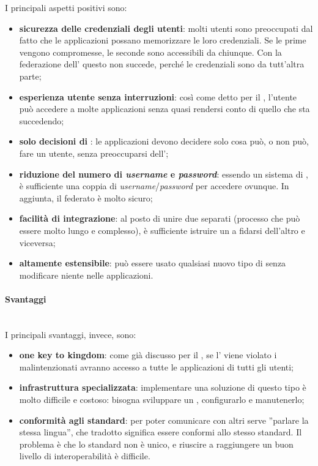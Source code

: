 I principali aspetti positivi sono:
\begin{itemize}
\item \textbf{sicurezza delle credenziali degli utenti}: molti utenti sono preoccupati dal fatto che le applicazioni possano memorizzare le loro credenziali. Se le prime vengono compromesse, le seconde sono accessibili da chiunque. Con la federazione dell' questo non succede, perché le credenziali sono da tutt'altra parte;
\item \textbf{esperienza utente senza interruzioni}: così come detto per il , l'utente può accedere a molte applicazioni senza quasi rendersi conto di quello che sta succedendo;
\item \textbf{solo decisioni di }: le applicazioni devono decidere solo cosa può, o non può, fare un utente, senza preoccuparsi dell';
\item \textbf{riduzione del numero di \textit{username} e \textit{password}}: essendo un sistema di , è sufficiente una coppia di \textit{username}/\textit{password} per accedere ovunque. In aggiunta, il  federato è molto sicuro;
\item \textbf{facilità di integrazione}: al posto di unire due  separati (processo che può essere molto lungo e complesso), è sufficiente istruire un  a fidarsi dell'altro e viceversa;
\item \textbf{altamente estensibile}: può essere usato qualsiasi nuovo tipo di  senza modificare niente nelle applicazioni.
\end{itemize}

\paragraph{Svantaggi} \mbox{} \\
I principali svantaggi, invece, sono:
\begin{itemize}
\item \textbf{one key to kingdom}: come già discusso per il , se l' viene violato i malintenzionati avranno accesso a tutte le applicazioni di tutti gli utenti;
\item \textbf{infrastruttura specializzata}: implementare una soluzione di questo tipo è molto difficile e costoso: bisogna sviluppare un , configurarlo e manutenerlo;
\item \textbf{conformità agli standard}: per poter comunicare con altri  serve ''parlare la stessa lingua'', che tradotto significa essere conformi allo stesso standard. Il problema è che lo standard non è unico, e riuscire a raggiungere un buon livello di interoperabilità è difficile.
\end{itemize}

